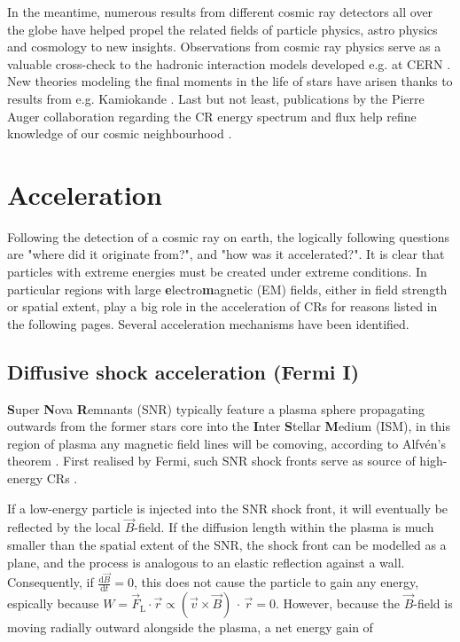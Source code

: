 In the meantime, numerous results from different cosmic ray detectors all over the globe have helped propel the related fields of particle physics, astro physics 
and cosmology to new insights. Observations from cosmic ray physics serve as a valuable cross-check to the hadronic interaction models developed e.g. at CERN 
\cite{ostapchenko2007status}. New theories modeling the final moments in the life of stars have arisen thanks to results from e.g. Kamiokande 
\cite{goldman1988implications}. Last but not least, publications by the Pierre Auger collaboration regarding the CR energy spectrum and flux help refine knowledge of 
our cosmic neighbourhood \cite{abraham2010measurement, aab2015searches}.

\section{Acceleration}
\label{sec:cr-acceleration}

Following the detection of a cosmic ray on earth, the logically following questions are "where did it originate from?", and "how was it accelerated?". It is clear 
that particles with extreme energies must be created under extreme conditions. In particular regions with large \textbf{e}lectro\textbf{m}agnetic (EM) fields, either 
in field strength or spatial extent, play a big role in the acceleration of CRs for reasons listed in the following pages. Several acceleration mechanisms have been identified.

\subsection{Diffusive shock acceleration (Fermi I)}
\label{ssec:cr-fermi-i}

\textbf{S}uper \textbf{N}ova \textbf{R}emnants (SNR) typically feature a plasma sphere propagating outwards from the former stars core into the 
\textbf{I}nter \textbf{S}tellar \textbf{M}edium (ISM), in this region of plasma any magnetic field lines will be comoving, according to Alfvén's theorem 
\cite{alfven1942existence}. First realised by Fermi, such SNR shock fronts serve as source of high-energy CRs \cite{fermi1949origin}.

If a low-energy particle is injected into the SNR shock front, it will eventually be reflected by the local $\vec{B}$-field. If the diffusion length within the
plasma is much smaller than the spatial extent of the SNR, the shock front can be modelled as a plane, and the process is analogous to an elastic reflection 
against a wall. Consequently, if $\frac{\text{d}\vec{B}}{\text{d}t} = 0$, this does not cause the particle to gain any energy, espically because 
$W = \vec{F}_\text{L} \cdot \vec{r} \propto (\vec{v}\times\vec{B})\,\cdot\,\vec{r} = 0$. However, because the $\vec{B}$-field is moving radially outward alongside 
the plasma, a net energy gain of 

